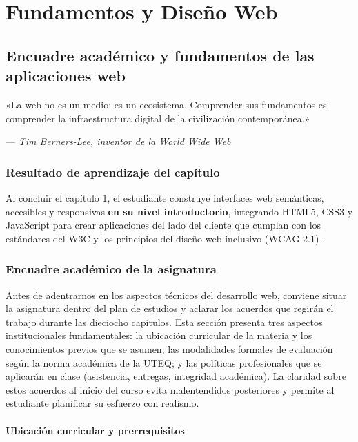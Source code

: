 \part{Fundamentos y Diseño Web}
\label{parte:unidad1}

\chapter{Encuadre académico y fundamentos de las aplicaciones web}
\label{cap:semana1}

\epigraph{«La web no es un medio: es un ecosistema. Comprender sus
fundamentos es comprender la infraestructura digital de la civilización
contemporánea.»}{--- \textit{Tim Berners-Lee, inventor de la World Wide Web}}

\section*{Resultado de aprendizaje del capítulo}
Al concluir el capítulo 1, el estudiante construye interfaces web
semánticas, accesibles y responsivas \textbf{en su nivel introductorio},
integrando HTML5, CSS3 y JavaScript para crear aplicaciones del lado
del cliente que cumplan con los estándares del W3C y los principios del
diseño web inclusivo (WCAG 2.1) \cite{w3c2018wcag}.

\section{Encuadre académico de la asignatura}

Antes de adentrarnos en los aspectos técnicos del desarrollo web,
conviene situar la asignatura dentro del plan de estudios y aclarar
los acuerdos que regirán el trabajo durante las dieciocho capítulos.
Esta sección presenta tres aspectos institucionales fundamentales: la
ubicación curricular de la materia y los conocimientos previos que se
asumen; las modalidades formales de evaluación según la norma
académica de la UTEQ; y las políticas profesionales que se aplicarán
en clase (asistencia, entregas, integridad académica). La claridad
sobre estos acuerdos al inicio del curso evita malentendidos
posteriores y permite al estudiante planificar su esfuerzo con
realismo.

\subsection{Ubicación curricular y prerrequisitos}

